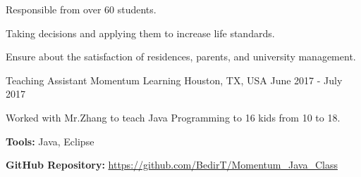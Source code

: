 \begin{cventries}
    {
      \begin{cvitems}
        \item {Responsible from over 60 students.}
        \item {Taking decisions and applying them to increase life standards.}
        \item {Ensure about the satisfaction of residences, parents, and university management.}
      \end{cvitems}
    }
    \cventry
  	{Teaching Assistant}
    {Momentum Learning}
    {Houston, TX, USA}
    {June 2017 - July 2017}
    {
      \begin{cvitems}
        \item {Worked with Mr.Zhang to teach Java Programming to 16 kids from 10 to 18.}
        \item {\textbf{Tools:} Java, Eclipse}
        \item {\textbf{GitHub Repository:} \href{https://github.com/BedirT/Momentum\_Java\_Class}{https://github.com/BedirT/Momentum\_Java\_Class}}
      \end{cvitems}
    }
    
    {
    }
\end{cventries}
